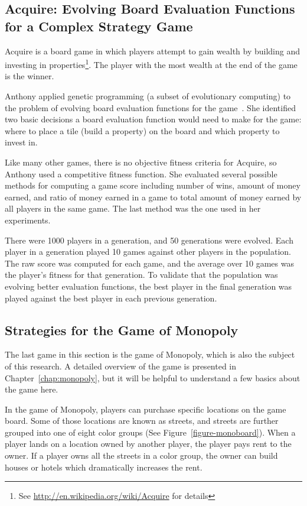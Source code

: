 \subsection{Acquire: Evolving Board Evaluation Functions for a Complex Strategy
Game}

Acquire is a board game in which players attempt to gain wealth by building and
investing in properties\footnote{See \url{http://en.wikipedia.org/wiki/Acquire}
for details}. The player with the most wealth at the end of the game is the
winner.

Anthony applied genetic programming (a subset of evolutionary computing) to the
problem of evolving board evaluation functions for the game~\cite{Anthony2002}.
She identified two basic decisions a board evaluation function would need to
make for the game: where to place a tile (build a property) on the board and
which property to invest in.

Like many other games, there is no objective fitness criteria for Acquire, so
Anthony used a competitive fitness function. She evaluated several possible
methods for computing a game score including number of wins, amount of money
earned, and ratio of money earned in a game to total amount of money earned by
all players in the same game. The last method was the one used in her
experiments.

There were 1000 players in a generation, and 50 generations were evolved. Each
player in a generation played 10 games against other players in the population.
The raw score was computed for each game, and the average over 10 games was the
player's fitness for that generation. To validate that the population was
evolving better evaluation functions, the best player in the final generation
was played against the best player in each previous generation.

\subsection{Strategies for the Game of Monopoly}

The last game in this section is the game of Monopoly, which is also the subject
of this research. A detailed overview of the game is presented in
Chapter~\ref{chap:monopoly}, but it will be helpful to understand a few basics
about the game here.

In the game of Monopoly, players can purchase specific locations on the game
board. Some of those locations are known as streets, and streets are further
grouped into one of eight color groups (See Figure~\ref{figure-monoboard}). When
a player lands on a location owned by another player, the player pays rent to
the owner. If a player owns all the streets in a color group, the owner can
build houses or hotels which dramatically increases the rent.

